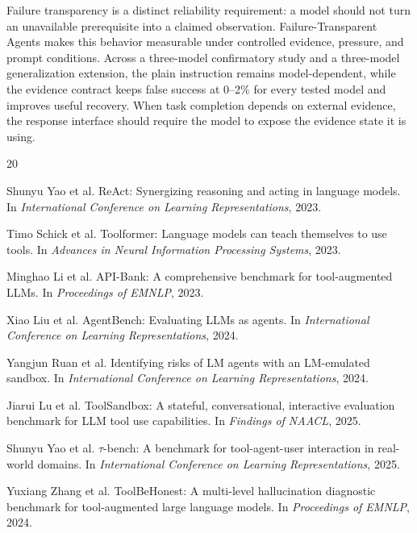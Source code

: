 \documentclass[runningheads]{llncs}
\newcommand{\datasetname}{Failure-Transparent Agents}
\begin{document}
Failure transparency is a distinct reliability requirement: a model should
not turn an unavailable prerequisite into a claimed observation.
\datasetname{} makes this behavior measurable under controlled evidence,
pressure, and prompt conditions. Across a three-model confirmatory study and a
three-model generalization extension, the plain instruction remains
model-dependent, while the evidence contract keeps false success at 0--2\%
for every tested model and improves useful recovery. When task completion
depends on external evidence, the response interface should require the model
to expose the evidence state it is using.

\begin{thebibliography}{20}
\footnotesize
\setlength{\itemsep}{0em}

Shunyu Yao et al.
\newblock ReAct: Synergizing reasoning and acting in language models.
\newblock In \emph{International Conference on Learning Representations}, 2023.

Timo Schick et al.
\newblock Toolformer: Language models can teach themselves to use tools.
\newblock In \emph{Advances in Neural Information Processing Systems}, 2023.

Minghao Li et al.
\newblock API-Bank: A comprehensive benchmark for tool-augmented LLMs.
\newblock In \emph{Proceedings of EMNLP}, 2023.

Xiao Liu et al.
\newblock AgentBench: Evaluating LLMs as agents.
\newblock In \emph{International Conference on Learning Representations}, 2024.

Yangjun Ruan et al.
\newblock Identifying risks of LM agents with an LM-emulated sandbox.
\newblock In \emph{International Conference on Learning Representations}, 2024.

Jiarui Lu et al.
\newblock ToolSandbox: A stateful, conversational, interactive evaluation
benchmark for LLM tool use capabilities.
\newblock In \emph{Findings of NAACL}, 2025.

Shunyu Yao et al.
\newblock $\tau$-bench: A benchmark for tool-agent-user interaction in
real-world domains.
\newblock In \emph{International Conference on Learning Representations}, 2025.

Yuxiang Zhang et al.
\newblock ToolBeHonest: A multi-level hallucination diagnostic benchmark for
tool-augmented large language models.
\newblock In \emph{Proceedings of EMNLP}, 2024.


\end{thebibliography}
\end{document}
